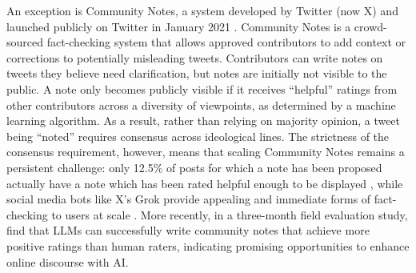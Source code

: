 An exception is Community Notes, a system developed by Twitter (now X) and launched publicly on Twitter in January 2021 \cite{Wojciketal2022Birdwatch}. Community Notes is a crowd-sourced fact-checking system that allows approved contributors to add context or corrections to potentially misleading tweets. Contributors can write notes on tweets they believe need clarification, but notes are initially not visible to the public. A note only becomes publicly visible if it receives ``helpful'' ratings from other contributors across a diversity of viewpoints, as determined by a machine learning algorithm. As a result, rather than relying on majority opinion, a tweet being ``noted'' requires consensus across ideological lines. The strictness of the consensus requirement, however, means that scaling Community Notes remains a persistent challenge: only 12.5\% of posts for which a note has been proposed actually have a note which has been rated helpful enough to be displayed \cite{Deetal2024Supernotes}, while social media bots like X's Grok provide appealing and immediate forms of fact-checking to users at scale \cite{ZhouAndHou2025FromNotesToBots}. More recently, in a three-month field evaluation study, \citet{LiAndBakker2026AIFactChecking} find that LLMs can successfully write community notes that achieve more positive ratings than human raters, indicating promising opportunities to enhance online discourse with AI.

